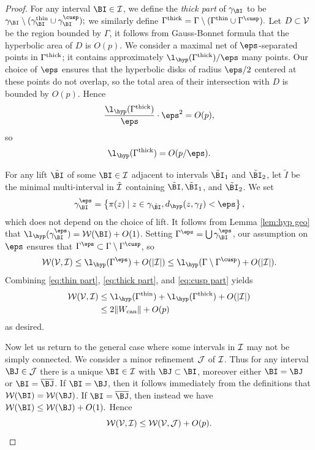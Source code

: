 \documentclass[12pt]{amsart}
\begin{document}
\begin{proof}
	For any interval $\BI\in \II$, we define the \textit{thick part} of $\gamma_\BI$ to be $\gamma_{\BI}\sm (\gamma_\BI^\thin\cup \gamma_\BI^\cusp);$ we similarly define 
	$\Gamma^\thick = \Gamma \sm (\Gamma^\thin\cup \Gamma^\cusp).$
	Let $D\subset \mathcal V$ be the region bounded by $\Gamma$, it follows from Gauss-Bonnet formula that the hyperbolic area of $D$ is $O(p)$.  
	We consider a maximal net of $\eps$-separated points in $\Gamma^{ \mathrm{thick}}$; it contains approximately $\l_\hyp(\Gamma^\thick)/\eps$ many points. 
	Our choice of $\eps$ ensures that the hyperbolic disks of radius $\eps/2$ centered at these points do not overlap, so the total area of their intersection with $D$ is bounded by $O(p)$. Hence
	$$\frac{\l_\hyp(\Gamma^\thick)}{\eps}\cdot \eps^2 =O(p),$$
	so \begin{equation}\label{eq:thick part}
		\l_\hyp(\Gamma^\thick) = O(p/\eps).
	\end{equation}
	
	
	For any lift $\tilde \BI$ of some $\BI\in \II$ adjacent to intervals $\tilde \BI_1$ and $\tilde \BI_2$, let $\tilde I$ be the minimal multi-interval in $\tilde {\mathcal I}$ containing $\tilde \BI, \tilde \BI_1$, and $\tilde \BI_2$.  We set  $$\gamma_\BI^\eps= \setofst{\pi(z)}{z\in \gamma_{\tilde \BI}, d_\hyp(z, \gamma_{\tilde I})< \eps},$$
	which does not depend on the choice of lift.
	It follows from Lemma \ref{lem:hyp geo} that $\l_\hyp(\gamma_\BI^\eps) = \WW(\BI)+ O(1)$.
	Setting $\Gamma^\eps = \bigcup \gamma_\BI^\eps$, our assumption on $\eps$ ensures that $\Gamma^\eps\subset \Gamma\sm \Gamma^\cusp$, so 
	\begin{equation}\label{eq:cusp part}
		\WW(\VV, \II)\leq \l_\hyp(\Gamma^\eps)+O(|\II|) \leq \l_\hyp(\Gamma\sm \Gamma^\cusp)+O(|\II|).
	\end{equation}
	Combining \eqref{eq:thin part}, \eqref{eq:thick part}, and \eqref{eq:cusp part} yields 
	\begin{align*}
		\WW(\VV, \II)&\leq \l_\hyp(\Gamma^\thin)+ \l_\hyp(\Gamma^\thick)+ O(|\II|)\\
		&\leq 2\|\wcan\|+O(p)
	\end{align*}
	as desired.
	
	Now let us return to the general case where some intervals in $\mathcal I$ may not be simply connected. We  consider a minor refinement $\mathcal J$ of $\mathcal I$. 
	Thus for any interval $\BJ\in \JJ$ there is a unique $\BI\in \II$ with $\BJ\subset \BI$, moreover either $\BI = \BJ$ or $\BI = \overline\BJ$. 
	If $\BI = \BJ$, then it follows immediately from the definitions that $\WW(\BI) = \WW(\BJ)$. If $\BI = \overline \BJ$, then instead we have
	$\WW(\BI)\leq \WW(\BJ)+O(1).$
	Hence 
	\begin{equation}\label{eq:minor widths}
		\mathcal W(\mathcal V, \mathcal I)\leq \mathcal W(\mathcal V, \mathcal J)+O(p).
	\end{equation}
	

\end{proof}
\end{document}
